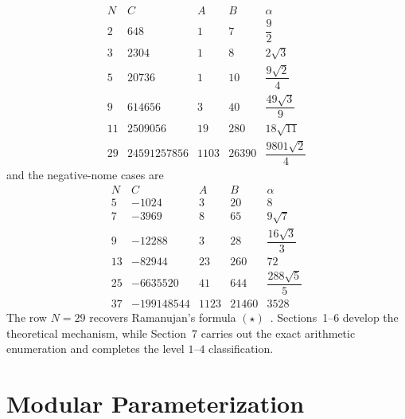 \documentclass[11pt,a4paper]{amsart} %
\theoremstyle{definition}
\begin{document}
    \[\begin{array}{c|r|r|r|c}
N&C&A&B&\alpha\\ \hline
2&648&1&7&\dfrac92\\[1mm]
3&2304&1&8&2\sqrt3\\[1mm]
5&20736&1&10&\dfrac{9\sqrt2}{4}\\[1mm]
9&614656&3&40&\dfrac{49\sqrt3}{9}\\[1mm]
11&2509056&19&280&18\sqrt{11}\\[1mm]
29&24591257856&1103&26390&
\dfrac{9801\sqrt2}{4}
\end{array}\]
    and the negative-nome cases are
    \[\begin{array}{c|r|r|r|c}
N&C&A&B&\alpha\\ \hline
5&-1024&3&20&8\\
7&-3969&8&65&9\sqrt7\\
9&-12288&3&28&\dfrac{16\sqrt3}{3}\\[1mm]
13&-82944&23&260&72\\
25&-6635520&41&644&\dfrac{288\sqrt5}{5}\\[1mm]
37&-199148544&1123&21460&3528
\end{array}\]
The row \(N=29\) recovers Ramanujan's formula \((\star)\)~\cite{Ram}.
Sections~1--6 develop the theoretical mechanism, while
Section~7 carries out the exact arithmetic enumeration and completes the
level \(1\)--\(4\) classification. 

\section{Modular Parameterization}
\end{document}
